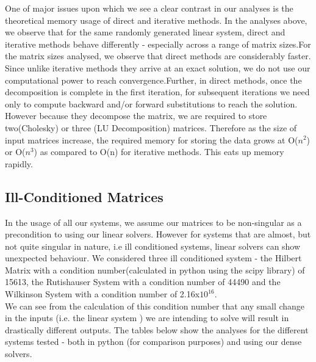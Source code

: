 \documentclass[twoside,twocolumn]{article}
\begin{document}
One of major issues upon which we see a clear contrast in our analyses is the theoretical memory usage of direct and iterative methods. 
In the analyses above, we observe that for the same randomly generated linear system, direct and iterative methods behave differently - especially across a range of matrix sizes.For the matrix sizes analysed, we observe that direct methods are considerably faster. Since unlike iterative methods they arrive at an exact solution, we do not use our computational power to reach convergence.Further, in direct methods, once the decomposition is complete in the first iteration, for subsequent iterations we need only to compute backward and/or forward substitutions to reach the solution. However because they decompose the matrix, we are required to store two(Cholesky) or three (LU Decomposition) matrices. Therefore as the size of input matrices increase, the required memory for storing the data grows at O($n^{2}$) or O($n^{3}$) as compared to O(n) for iterative methods. This eats up memory rapidly.
\subsection{Ill-Conditioned Matrices}
In the usage of all our systems, we assume our matrices to be non-singular as a precondition to using our linear solvers. However for systems that are almost, but not quite singular in nature, i.e ill conditioned systems, linear solvers can show unexpected behaviour. 
We considered three ill conditioned system - the Hilbert Matrix with a condition number(calculated in python using the scipy library) of 15613, the Rutishauser System with a condition number of 44490 and the Wilkinson System with a condition number of 2.16x$10^{16}$. \\ We can see from the calculation of this condition number that any small change in the inputs (i.e. the linear system ) we are intending to solve will result in drastically different outputs. The tables below show the analyses for the different systems tested  - both in python (for comparison purposes) and using our dense solvers.

\begin{table}[H]
\caption{Ill Condition Matrices}
\label{tab:my-table}
\vspace{-5mm}
\end{table}
\end{document}
